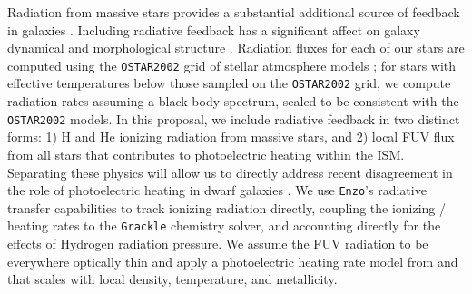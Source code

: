 \documentclass[11pt]{article}
\newcommand{\eg}{e.g.,}
\begin{document}
Radiation from massive stars provides a substantial additional source of feedback in galaxies \citep[\eg][]{Agertz2013}. Including radiative feedback has a significant affect on galaxy dynamical and morphological structure \citep[\eg][]{WiseAbel2012, Kim2013a, Kim2013b, Roskar2014, Rosdahl2015}. Radiation fluxes for each of our stars are computed using the \texttt{OSTAR2002} grid of stellar atmosphere models \citep{Lanz2003}; for stars with effective temperatures below those sampled on the \texttt{OSTAR2002} grid, we compute radiation rates assuming a black body spectrum, scaled to be consistent with the \texttt{OSTAR2002} models. In this proposal, we include radiative feedback in two distinct forms: 1) H and He ionizing radiation from massive stars, and 2) local FUV flux from all stars that contributes to photoelectric heating within the ISM. Separating these physics will allow us to directly address recent disagreement in the role of photoelectric heating in dwarf galaxies \citep{Hu2016, Forbes2016}. We use \texttt{Enzo}'s radiative transfer capabilities \citep{Wise2012a,WiseAbel2012,Wise2014} to track ionizing radiation directly, coupling the ionizing / heating rates to the \texttt{Grackle} chemistry solver, and accounting directly for the effects of Hydrogen radiation pressure. We assume the FUV radiation to be everywhere optically thin and apply a photoelectric heating rate model from \cite{BakesTielens1994} and \cite{Wolfire2003} that scales with local density, temperature, and metallicity.



\end{document}
